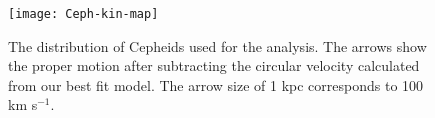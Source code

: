 \documentclass[11pt,a4paper]{article}
\begin{document}
\begin{figure}
\leavevmode
\texttt{[image: Ceph-kin-map]}
\caption{\small
 The distribution of Cepheids used for the analysis. The arrows show the proper motion after subtracting the circular velocity calculated from our best fit model. The arrow size of 1 kpc corresponds to 100 km s$^{-1}$.
}
\label{fig-Ceph-kin-map}
\end{figure}




\footnotesize

\setlength{\baselineskip}{0pt}
\setlength{\bibsep}{0pt}

\end{document}
